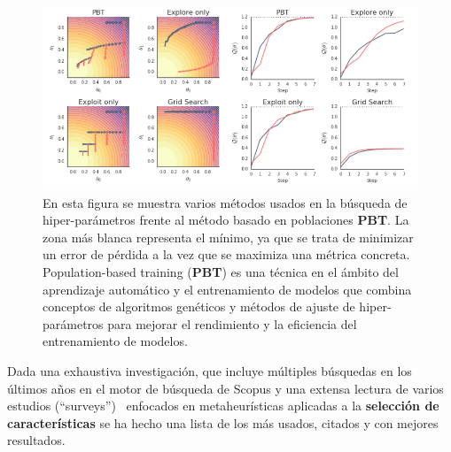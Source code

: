 \begin{figure}[htp]
  \begin{center}
    \includegraphics[width=1\textwidth]{imagenes/pbt.png}
  \end{center}
  \caption[PBT en Redes Neuronales]{En esta figura se muestra varios métodos usados en la búsqueda de hiper-parámetros frente al método basado en poblaciones \textbf{PBT}. La zona más blanca representa el mínimo, ya que se trata de minimizar un error de pérdida a la vez que se maximiza una métrica concreta. Population-based training (\textbf{PBT}) es una técnica en el ámbito del aprendizaje automático y el entrenamiento de modelos que combina conceptos de algoritmos genéticos y métodos de ajuste de hiper-parámetros para mejorar el rendimiento y la eficiencia del entrenamiento de modelos.~\cite{jaderberg2017population}}
\end{figure}

Dada una exhaustiva investigación, que incluye múltiples búsquedas en los últimos años en el motor de búsqueda de Scopus y una extensa lectura de varios estudios (``surveys'')~\cite{dokeroglu_comprehensive_2022, agrawal_metaheuristic_2021, boussaid_survey_2013} enfocados en metaheurísticas aplicadas a la \textbf{selección de características} se ha hecho una lista de los más usados, citados y con mejores resultados.

